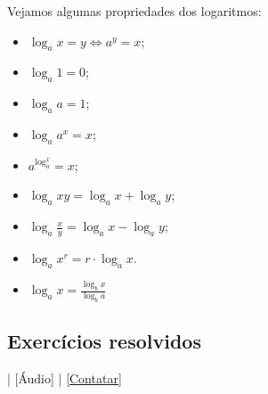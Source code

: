 \begin{obs}
  Vejamos algumas propriedades dos logaritmos:
  \begin{itemize}
  \item $\displaystyle \log_a x = y \Leftrightarrow a^y = x$;
  \item $\displaystyle \log_a 1 = 0$;
  \item $\displaystyle \log_a a = 1$;
  \item $\displaystyle \log_a a^x = x$;
  \item $\displaystyle a^{\log_a^x} = x$;
  \item $\displaystyle \log_a xy = \log_a x + \log_a y$;
  \item $\displaystyle \log_a \frac{x}{y} = \log_a x - \log_a y$;
  \item $\displaystyle \log_a x^r = r\cdot\log_a x$.
  \item $\displaystyle \log_a x = \frac{\log_b x}{\log_b a}$
  \end{itemize}
\end{obs}

\subsection*{Exercícios resolvidos}

\begin{flushright}
  [Vídeo] | [Áudio] | \href{https://phkonzen.github.io/notas/contato.html}{[Contatar]}
\end{flushright}

